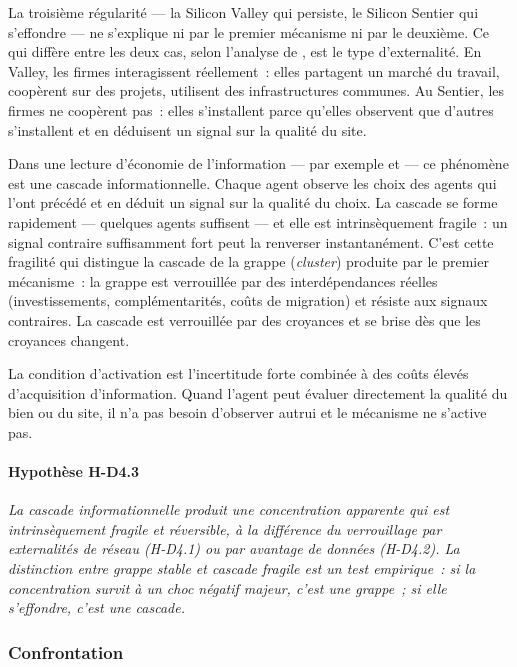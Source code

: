 \markNEO

La troisième régularité --- la Silicon Valley qui persiste, le Silicon Sentier qui s'effondre --- ne s'explique ni par le premier mécanisme ni par le deuxième. Ce qui diffère entre les deux cas, selon l'analyse de \textcite{vicente_externalites_2002}, est le type d'externalité. En Valley, les firmes interagissent réellement~: elles partagent un marché du travail, coopèrent sur des projets, utilisent des infrastructures communes. Au Sentier, les firmes ne coopèrent pas~: elles s'installent parce qu'elles observent que d'autres s'installent et en déduisent un signal sur la qualité du site.

Dans une lecture d'économie de l'information --- par exemple \textcite{banerjee_simple_1992} et \textcite{bikhchandani_theory_1992} --- ce phénomène est une cascade informationnelle. Chaque agent observe les choix des agents qui l'ont précédé et en déduit un signal sur la qualité du choix. La cascade se forme rapidement --- quelques agents suffisent --- et elle est intrinsèquement fragile~: un signal contraire suffisamment fort peut la renverser instantanément. C'est cette fragilité qui distingue la cascade de la grappe (\emph{cluster}) produite par le premier mécanisme~: la grappe est verrouillée par des interdépendances réelles (investissements, complémentarités, coûts de migration) et résiste aux signaux contraires. La cascade est verrouillée par des croyances et se brise dès que les croyances changent.

La condition d'activation est l'incertitude forte combinée à des coûts élevés d'acquisition d'information. Quand l'agent peut évaluer directement la qualité du bien ou du site, il n'a pas besoin d'observer autrui et le mécanisme ne s'active pas.

\paragraph{Hypothèse H-D4.3} \emph{La cascade informationnelle produit une concentration apparente qui est intrinsèquement fragile et réversible, à la différence du verrouillage par externalités de réseau (H-D4.1) ou par avantage de données (H-D4.2). La distinction entre grappe stable et cascade fragile est un test empirique~: si la concentration survit à un choc négatif majeur, c'est une grappe~; si elle s'effondre, c'est une cascade.}


\subsubsection{Confrontation}


